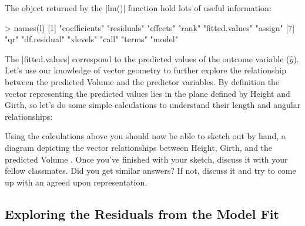 The object returned by the |lm()| function hold lots of useful information:
%
\begin{R}
> names(l)
 [1] "coefficients"  "residuals"     "effects"       
     "rank"          "fitted.values" "assign"
 [7] "qr"            "df.residual"   "xlevels" 
     "call"          "terms"         "model"
\end{R}
%
The |fitted.values| correspond to the predicted values of the outcome variable ($\hat{y}$). Let's use our knowledge of vector geometry to further explore the relationship between the predicted Volume and the predictor variables.  By definition the vector representing the predicted values lies in the plane defined by Height and Girth, so let's do some simple calculations to understand their length and angular relationships:
%
%

\begin{tcolorbox}[title=In class assignment]
Using the calculations above you should now be able to sketch out by hand, a diagram depicting the vector relationships between Height, Girth, and the predicted Volume .  Once you've finished with your sketch, discuss it with your fellow classmates.  Did you get similar answers? If not, discuss it and try to come up with an agreed upon representation.
\end{tcolorbox}

\subsection{Exploring the Residuals from the Model Fit}

